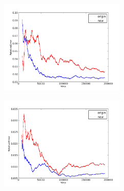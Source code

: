 \documentclass{beamer}
\begin{document}
\begin{frame}
\begin{figure}
  \begin{subfigure}[b]{.45\linewidth}
    \centering
    \includegraphics[height=4.5cm]{RelativeError.png}
  \end{subfigure}\hfill
  \begin{subfigure}[b]{.45\linewidth}
    \centering
    \includegraphics[height=4.5cm]{RelativeError2.png}
  \end{subfigure}\hfill
\end{figure}
\end{frame}
\end{document}
